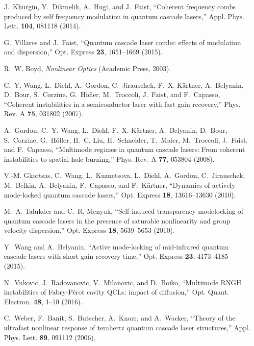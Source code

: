 \documentclass[10pt]{article}
\begin{document}
\begin{thebibliography}{10}
	J.~Khurgin, Y.~Dikmelik, A.~Hugi, and J.~Faist, \enquote{Coherent frequency
		combs produced by self frequency modulation in quantum cascade lasers,} Appl.
	Phys. Lett. \textbf{104}, 081118 (2014).
	
	G.~Villares and J.~Faist, \enquote{Quantum cascade laser combs: effects of
		modulation and dispersion,} Opt. Express \textbf{23}, 1651--1669 (2015).
	
	R.~W. Boyd, \emph{Nonlinear {O}ptics} (Academic {P}ress, 2003).
	
	C.~Y. Wang, L.~Diehl, A.~Gordon, C.~Jirauschek, F.~X. K\"artner, A.~Belyanin,
	D.~Bour, S.~Corzine, G.~H\"ofler, M.~Troccoli, J.~Faist, and F.~Capasso,
	\enquote{Coherent instabilities in a semiconductor laser with fast gain
		recovery,} Phys. Rev. A \textbf{75}, 031802 (2007).
	
	A.~Gordon, C.~Y. Wang, L.~Diehl, F.~X. K\"artner, A.~Belyanin, D.~Bour,
	S.~Corzine, G.~H\"ofler, H.~C. Liu, H.~Schneider, T.~Maier, M.~Troccoli,
	J.~Faist, and F.~Capasso, \enquote{Multimode regimes in quantum cascade
		lasers: From coherent instabilities to spatial hole burning,} Phys. Rev. A
	\textbf{77}, 053804 (2008).
	
	V.-M. Gkortsas, C.~Wang, L.~Kuznetsova, L.~Diehl, A.~Gordon, C.~Jirauschek,
	M.~Belkin, A.~Belyanin, F.~Capasso, and F.~K{\"a}rtner, \enquote{Dynamics of
		actively mode-locked quantum cascade lasers,} Opt. Express \textbf{18},
	13616--13630 (2010).
	
	M.~A. Talukder and C.~R. Menyuk, \enquote{Self-induced transparency modelocking
		of quantum cascade lasers in the presence of saturable nonlinearity and group
		velocity dispersion,} Opt. Express \textbf{18}, 5639--5653 (2010).
	
	Y.~Wang and A.~Belyanin, \enquote{Active mode-locking of mid-infrared quantum
		cascade lasers with short gain recovery time,} Opt. Express \textbf{23},
	4173--4185 (2015).
	
	N.~Vukovic, J.~Radovanovic, V.~Milanovic, and D.~Boiko, \enquote{{Multimode
			RNGH instabilities of Fabry-P{\'e}rot cavity QCLs: impact of diffusion},}
	Opt. Quant. Electron. \textbf{48}, 1--10 (2016).
	
	C.~Weber, F.~Banit, S.~Butscher, A.~Knorr, and A.~Wacker, \enquote{Theory of
		the ultrafast nonlinear response of terahertz quantum cascade laser
		structures,} Appl. Phys. Lett. \textbf{89}, 091112 (2006).
	

\end{thebibliography}
\end{document}
